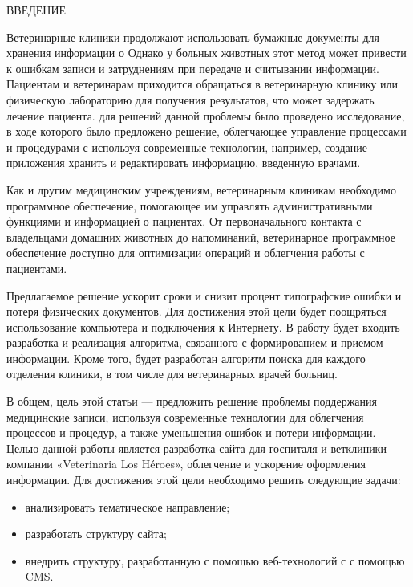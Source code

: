 \newpage
\begin{center}ВВЕДЕНИЕ\end{center}


Ветеринарные клиники продолжают использовать бумажные документы для хранения информации о Однако у больных животных этот метод может привести к ошибкам записи и затруднениям при передаче и считывании информации. Пациентам и ветеринарам приходится обращаться в ветеринарную клинику или физическую лабораторию для получения результатов, что может задержать лечение пациента.
для решений данной проблемы было проведено исследование, в ходе которого было предложено решение, облегчающее управление процессами и процедурами с
используя современные технологии, например, создание приложения
хранить и редактировать информацию, введенную врачами.

Как и другим медицинским учреждениям, ветеринарным клиникам необходимо программное обеспечение, помогающее им управлять административными функциями и информацией о пациентах. От первоначального контакта с владельцами домашних животных до напоминаний, ветеринарное программное обеспечение доступно для оптимизации операций и облегчения работы с пациентами.

Предлагаемое решение ускорит сроки и снизит процент типографские ошибки и потеря физических документов. Для достижения этой цели будет поощряться использование компьютера и подключения к Интернету. В работу будет входить разработка и реализация алгоритма, связанного с формированием и приемом информации. Кроме того, будет разработан алгоритм поиска для каждого отделения клиники, в том числе для ветеринарных врачей больниц.

В общем, цель этой статьи — предложить решение проблемы поддержания
медицинские записи, используя современные технологии для облегчения процессов и процедур, а также уменьшения ошибок и потери информации.
Целью данной работы является разработка сайта для госпиталя и ветклиники компании «Veterinaria Los Héroes», облегчение и ускорение оформления информации. Для достижения этой цели необходимо решить
следующие задачи:

\begin{itemize}
	\item анализировать тематическое направление;
	\item разработать структуру сайта;
	\item внедрить структуру, разработанную с помощью веб-технологий с\linebreak
	с помощью CMS.
\end{itemize}

